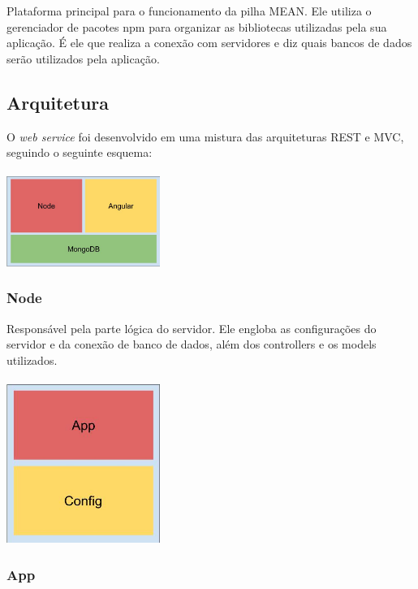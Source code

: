 \documentclass[
	12pt,				%
	oneside,			%
	a4paper,			%
	brazil				%
]{abntex2}
\begin{document}
Plataforma principal para o funcionamento da pilha MEAN. Ele utiliza o gerenciador de pacotes npm para organizar as bibliotecas utilizadas pela sua aplicação. É ele que realiza a conexão com servidores e diz quais bancos de dados serão utilizados pela aplicação.


\subsection{Arquitetura}

O \textit{web service} foi desenvolvido em uma mistura das arquiteturas REST e MVC, seguindo o seguinte esquema: 
\\
\\
\includegraphics[width=5cm, center]{images/brick_diagram_framework_webservice}

\subsubsection{Node}

Responsável pela parte lógica do servidor. Ele engloba as configurações do servidor e da conexão de banco de dados, além dos controllers e os models utilizados.
\\
\\
\includegraphics[width=5cm, center]{images/brick_diagram_node}

\subsubsection{App}
\end{document}
